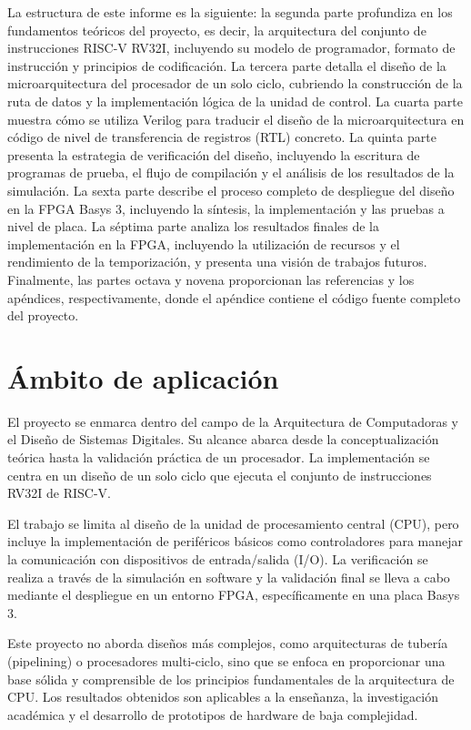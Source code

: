 La estructura de este informe es la siguiente: la segunda parte profundiza en los fundamentos teóricos del proyecto, es decir, la arquitectura del conjunto de instrucciones RISC-V RV32I, incluyendo su modelo de programador, formato de instrucción y principios de codificación. La tercera parte detalla el diseño de la microarquitectura del procesador de un solo ciclo, cubriendo la construcción de la ruta de datos y la implementación lógica de la unidad de control. La cuarta parte muestra cómo se utiliza Verilog para traducir el diseño de la microarquitectura en código de nivel de transferencia de registros (RTL) concreto. La quinta parte presenta la estrategia de verificación del diseño, incluyendo la escritura de programas de prueba, el flujo de compilación y el análisis de los resultados de la simulación. La sexta parte describe el proceso completo de despliegue del diseño en la FPGA Basys 3, incluyendo la síntesis, la implementación y las pruebas a nivel de placa. La séptima parte analiza los resultados finales de la implementación en la FPGA, incluyendo la utilización de recursos y el rendimiento de la temporización, y presenta una visión de trabajos futuros. Finalmente, las partes octava y novena proporcionan las referencias y los apéndices, respectivamente, donde el apéndice contiene el código fuente completo del proyecto.

\section{Ámbito de aplicación}

El proyecto se enmarca dentro del campo de la Arquitectura de Computadoras y el Diseño de Sistemas Digitales. Su alcance abarca desde la conceptualización teórica hasta la validación práctica de un procesador. La implementación se centra en un diseño de un solo ciclo que ejecuta el conjunto de instrucciones RV32I de RISC-V.

El trabajo se limita al diseño de la unidad de procesamiento central (CPU), pero incluye la implementación de periféricos básicos como controladores para manejar la comunicación con dispositivos de entrada/salida (I/O). La verificación se realiza a través de la simulación en software y la validación final se lleva a cabo mediante el despliegue en un entorno FPGA, específicamente en una placa Basys 3.

Este proyecto no aborda diseños más complejos, como arquitecturas de tubería (pipelining) o procesadores multi-ciclo, sino que se enfoca en proporcionar una base sólida y comprensible de los principios fundamentales de la arquitectura de CPU. Los resultados obtenidos son aplicables a la enseñanza, la investigación académica y el desarrollo de prototipos de hardware de baja complejidad.

\chapterend
